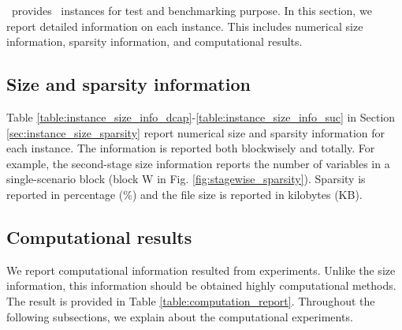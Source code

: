 %
%

\siplibtwo\ provides \smps\ instances for test and benchmarking  purpose. In this section, we report detailed information on each instance. This includes numerical size information, sparsity information, and computational results.

\subsection{Size and sparsity information}
Table \ref{table:instance_size_info_dcap}-\ref{table:instance_size_info_suc} in Section \ref{sec:instance_size_sparsity} report numerical size and sparsity information for each instance. The information is reported both blockwisely and totally. For example, the second-stage size information reports the number of variables in a single-scenario block (block W in Fig. \ref{fig:stagewise_sparsity}). Sparsity is reported in percentage (\%) and the file size is reported in kilobytes (KB).

\subsection{Computational results}
We report computational information resulted from experiments. Unlike the size information, this information should be obtained highly computational methods. The result is provided in Table \ref{table:computation_report}. Throughout the following subsections, we explain about the computational experiments.

